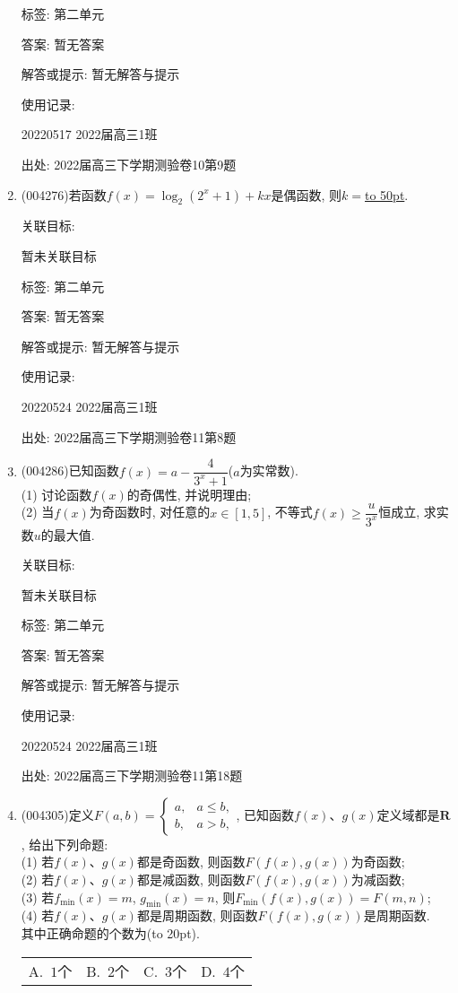 \documentclass[10pt,a4paper]{article}
\newcommand{\blank}[1]{\underline{\hbox to #1pt{}}}
\newcommand{\bracket}[1]{(\hbox to #1pt{})}
\newcommand{\fourch}[4]{\par\begin{tabular}{p{.23\textwidth}p{.23\textwidth}p{.23\textwidth}p{.23\textwidth}}
A.~#1 &B.~#2& C.~#3& D.~#4
\end{tabular}}
\begin{document}
\begin{enumerate}[1.]
标签: 第二单元

答案: 暂无答案

解答或提示: 暂无解答与提示

使用记录:

20220517	2022届高三1班	


出处: 2022届高三下学期测验卷10第9题
\item { (004276)}若函数$f(x)=\log_2(2^x+1)+kx$是偶函数, 则$k=$\blank{50}.


关联目标:

暂未关联目标



标签: 第二单元

答案: 暂无答案

解答或提示: 暂无解答与提示

使用记录:

20220524	2022届高三1班	


出处: 2022届高三下学期测验卷11第8题
\item { (004286)}已知函数$f(x)=a-\dfrac 4{3^x+1}$($a$为实常数).\\
(1) 讨论函数$f(x)$的奇偶性, 并说明理由;\\ 
(2) 当$f(x)$为奇函数时, 对任意的$x\in [1,5]$, 不等式$f(x)\ge \dfrac u{3^x}$恒成立, 求实数$u$的最大值.


关联目标:

暂未关联目标



标签: 第二单元

答案: 暂无答案

解答或提示: 暂无解答与提示

使用记录:

20220524	2022届高三1班		


出处: 2022届高三下学期测验卷11第18题
\item { (004305)}定义$F(a,b)=\begin{cases} a, & a \le b, \\ b, & a>b,\end{cases}$, 已知函数$f(x)$、$g(x)$定义域都是$\mathbf{R}$, 给出下列命题:\\
(1) 若$f(x)$、$g(x)$都是奇函数, 则函数$F(f(x),g(x))$为奇函数;\\
(2) 若$f(x)$、$g(x)$都是减函数, 则函数$F(f(x),g(x))$为减函数;\\
(3) 若$f_{\min}(x)=m$, $g_{\min}(x)=n$, 则$F_{\min}(f(x),g(x))=F(m,n)$;\\
(4) 若$f(x)$、$g(x)$都是周期函数, 则函数$F(f(x),g(x))$是周期函数.\\
其中正确命题的个数为\bracket{20}.
\fourch{$1$个}{$2$个}{$3$个}{$4$个}



\end{enumerate}
\end{document}
